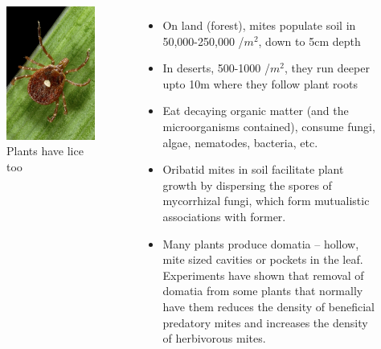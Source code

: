 \documentclass[
  ignorenonframetext,
  aspectratio=169]{beamer}
\begin{document}
\begin{frame}{}
\protect\hypertarget{section-4}{}
\begin{columns}[T,totalwidth=\textwidth]

\begin{figure}
\includegraphics[width=0.7\linewidth]{./../images/twttr/plant_lice_D4Ti2L6XsAI4xsQ} \caption{Plants have lice too}\label{fig:plantlice}
\end{figure}

  \begin{itemize}
  \footnotesize
  \item On land (forest), mites populate soil in 50,000-250,000 /$m^2$, down to 5cm depth
  \item In deserts, 500-1000 /$m^2$, they run deeper upto 10m where they follow plant roots
  \item Eat decaying organic matter (and the microorganisms contained), consume fungi, algae, nematodes, bacteria, etc.
  \item Oribatid mites in soil facilitate plant growth by dispersing the spores of mycorrhizal fungi, which form mutualistic associations with former.
  \item Many plants produce domatia -- hollow, mite sized cavities or pockets in the leaf. Experiments have shown that removal of domatia from some plants that normally have them reduces the density of beneficial predatory mites and increases the density of herbivorous mites.
  \end{itemize}

\end{columns}
\end{frame}
\end{document}
